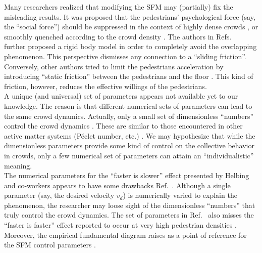 \documentclass[preprint,12pt]{elsarticle}
\begin{document}
Many researchers realized that modifying the SFM may (partially) fix the
misleading results. It was proposed that the pedestrians'  psychological force
(say, the ``social force'') should be suppressed in the  context of highly dense
crowds  \cite{pelechano_2007,moussaid_2011,alonso_2014,bottinelli_2017}, or
smoothly  quenched according to the crowd density \cite{song_2019}. The authors
in  Refs.~\cite{kabalan_2017,jebrane_2019} further proposed a rigid body model
in  order to completely avoid the overlapping phenomenon. This perspective
dismisses  any connection to a ``sliding friction''. Conversely, other authors
tried to  limit the pedestrians acceleration by introducing ``static friction''
between  the pedestrians and the floor \cite{wang_2019}. This kind of friction,
however,  reduces the effective willings of the pedestrians.  \\

A unique (and universal) set of parameters appears not available yet to our
knowledge.   The reason is that different numerical sets of parameters can lead
to  the same crowd dynamics. Actually, only a small set of dimensionless
``numbers'' control the crowd dynamics \cite{dorso_2019}. These are similar to
those encountered in other active matter systems (P\'eclet number, etc.)
\cite{marchetti_2014}. We may hypothesize that while the dimensionless
parameters provide some kind of control on the  collective behavior in  crowds,
only a few numerical set of parameters can attain an ``individualistic''
meaning.   \\

The numerical parameters for the ``faster is slower'' effect presented by
Helbing and co-workers appears to have some drawbacks
Ref.~\cite{helbing_2000,dorso_2017,dorso_2019}. Although a single  parameter
(say, the desired velocity $v_d$) is numerically varied to  explain the
phenomenon, the researcher may loose sight of the dimensionless  ``numbers''
that truly control the crowd dynamics. The set of parameters in
Ref.~\cite{helbing_2000} also misses the ``faster is faster'' effect reported
to occur at very high pedestrian densities \cite{dorso_2017,haghani_2019}.
Moreover, the empirical fundamental diagram raises as a point of reference  for
the SFM control parameters \cite{helbing_2007,dorso_2017}. \\
\end{document}
